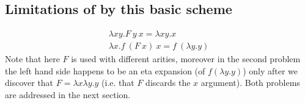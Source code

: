 \documentclass[sigconf,natbib=false,review]{acmart}
\newcommand{\UnifRel}{\ensuremath{\simeq}}
\newcommand{\Uo}{\ensuremath{\UnifRel_o}\xspace}
\newcommand{\Ue}{\ensuremath{\UnifRel_\lambda}\xspace}
\begin{document}
\subsection{Limitations of by this basic scheme}

\begin{gather}
\lambda x y.F~y~x = \lambda x y.x\\
\lambda x. f~(F~x)~x = f~(\lambda y.y)
\end{gather}
Note that here $F$ is used with different arities, moreover
in the second problem the left hand side happens to be an
eta expansion (of $f (\lambda y.y)$) only after we discover that
$F = \lambda x\lambda y.y$ (i.e. that $F$ discards the $x$ argument).
Both problems are addressed in the next section.
  





\end{document}
